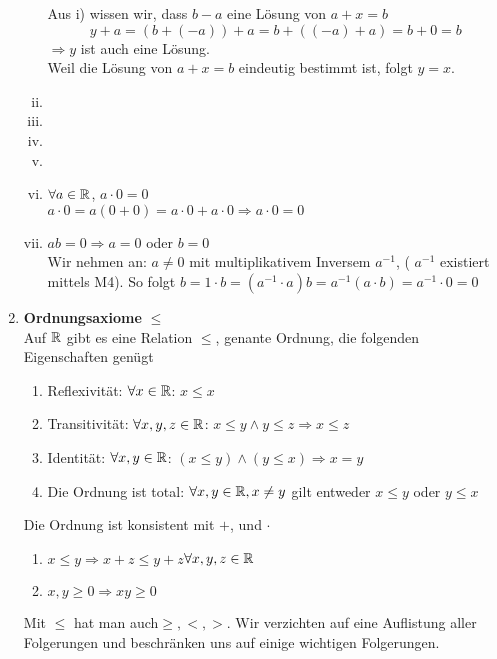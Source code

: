 \begin{enumerate}
\begin{enumerate}[i)]
\noindent Aus i) wissen wir, dass $b-a$ eine Lösung von $a+x=b$ \[y+a=\left( b+(-a)\right)+a=b+\left( (-a)+a\right)=b+0=b\]
$\Rightarrow y$ ist auch eine Lösung.\\
Weil die Lösung von $a+x=b$ eindeutig bestimmt ist, folgt $y=x$.
\item
\item
\item
\item
{}
\item $\forall a\in\mathbb{R}$, $a\cdot 0=0$\\
$a\cdot 0=a(0+0)=a\cdot 0+a\cdot 0\Rightarrow a\cdot 0=0$
\item $ab=0\Rightarrow a=0$ oder $b=0$\\
Wir nehmen an: $a\not=0$ mit multiplikativem Inversem $a^{-1}$, ( $a^{-1}$ existiert mittels M4). So folgt $b=1\cdot b=\left( a^{-1}\cdot a\right)b=a^{-1}(a\cdot b)=a^{-1}\cdot 0=0$
\end{enumerate}
\item \textbf{Ordnungsaxiome} $\leq$\\
Auf $\mathbb{R}$ gibt es eine Relation $\leq$, genante Ordnung, die folgenden Eigenschaften genügt
\begin{enumerate}
\item Reflexivität: $\forall x\in\mathbb{R}$: $x\leq x$
\item Transitivität: $\forall x,y,z\in\mathbb{R}$: $x\leq y\land y\leq z\Rightarrow x\leq z$
\item Identität: $\forall x,y\in\mathbb{R}$: $(x\leq y) \wedge(y\leq x)\Rightarrow x=y$
\item Die Ordnung ist total: $\forall x,y\in\mathbb{R}, x \neq y$ gilt entweder $x\leq y$ oder $y\leq x$
\end{enumerate}
Die Ordnung ist konsistent mit $+$, und $\cdot$
\begin{enumerate}
\item $x\leq y\Rightarrow x+z\leq y+z$\hspace{10mm}$\forall x,y,z\in\mathbb{R}$
\item $x,y\geq 0\Rightarrow xy\geq 0$
\end{enumerate}
Mit $\leq$ hat man auch$\geq,<,>$. Wir verzichten auf eine Auflistung aller Folgerungen und beschränken uns auf einige wichtigen Folgerungen.

\end{enumerate}
